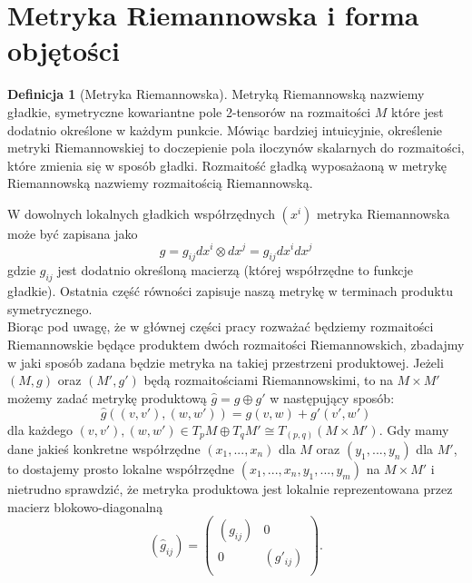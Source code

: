\documentclass[licencjacka]{pracamgr}
\theoremstyle{definition}
\newtheorem{definition}{Definicja}[section]
\theoremstyle{definition}
\theoremstyle{plain}
\theoremstyle{plain}
\theoremstyle{plain}
\theoremstyle{plain}
\begin{document}
\section{Metryka Riemannowska i forma objętości}

\begin{definition}[Metryka Riemannowska]
Metryką Riemannowską nazwiemy gładkie, symetryczne kowariantne pole 2-tensorów
na rozmaitości $M$ które jest dodatnio określone w każdym punkcie. Mówiąc
bardziej intuicyjnie, określenie metryki Riemannowskiej to doczepienie pola
iloczynów skalarnych do rozmaitości, które zmienia się w sposób gładki.
Rozmaitość gładką wyposażaoną w metrykę Riemannowską nazwiemy rozmaitością
Riemannowską.
\end{definition}

W dowolnych lokalnych gładkich współrzędnych $(x^i)$ metryka Riemannowska
może być zapisana jako
\[ %
    g = g_{ij} dx^i \otimes dx^j = g_{ij} dx^i dx^j
\]
gdzie
$g_{ij}$
jest dodatnio określoną macierzą (której współrzędne to funkcje gładkie). Ostatnia
część równości zapisuje naszą metrykę w terminach produktu symetrycznego. \\

Biorąc pod uwagę, że w głównej części pracy rozważać będziemy
rozmaitości Riemannowskie będące produktem dwóch rozmaitości
Riemannowskich, zbadajmy w jaki sposób zadana będzie metryka na takiej
przestrzeni produktowej. Jeżeli $(M, g)$ oraz $(M', g')$ będą rozmaitościami
Riemannowskimi, to na $M \times M'$ możemy zadać metrykę produktową
 $\hat g = g \oplus g'$ w następujący sposób:
\begin{equation}\label{metric-form}
\hat g
 \left( (v, v'), (w, w') \right) =
 g(v, w) + g'(v', w')
\end{equation}
dla każdego
 $(v, v'), (w, w') \in T_p M \oplus T_q M' \cong T_{(p, q)} (M \times M')$.
Gdy mamy dane jakieś konkretne współrzędne $(x_1, ... , x_n)$ dla $M$ oraz
$(y_1, ..., y_n)$ dla $M'$, to dostajemy prosto lokalne współrzędne $(x_1, ...,
x_n, y_1, ..., y_m)$ na $M \times M'$ i nietrudno sprawdzić, że metryka
produktowa jest lokalnie reprezentowana przez macierz blokowo-diagonalną
\[
  \left(\hat g_{ij} \right)  = 
  \left(
    \begin{array}{cc}
  \left( g_{ij} \right) &  0 \\
      0      & \left( g'_{ij} \right) \\
      \end{array}
  \right).
\] \\
\end{document}

